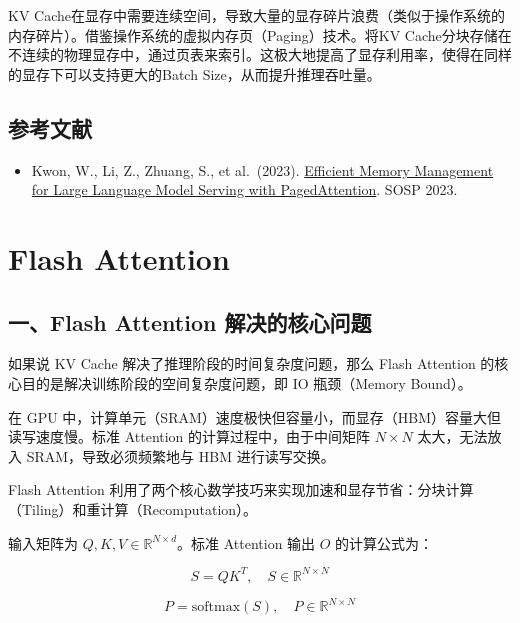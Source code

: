 KV Cache在显存中需要连续空间，导致大量的显存碎片浪费（类似于操作系统的内存碎片）。借鉴操作系统的虚拟内存页（Paging）技术。将KV Cache分块存储在不连续的物理显存中，通过页表来索引。这极大地提高了显存利用率，使得在同样的显存下可以支持更大的Batch Size，从而提升推理吞吐量。

\hypertarget{ux53c2ux8003ux6587ux732e-91}{%
\subsection{参考文献}\label{ux53c2ux8003ux6587ux732e-91}}

\vspace{0.25em}
\begin{itemize}
\tightlist
\item
  Kwon, W., Li, Z., Zhuang, S., et al.~(2023). \href{https://arxiv.org/abs/2309.06180}{Efficient Memory Management for Large Language Model Serving with PagedAttention}. SOSP 2023.
\end{itemize}

\clearpage

\hypertarget{flash-attention}{%
\section{Flash Attention}\label{flash-attention}}

\hypertarget{ux4e00flash-attention-ux89e3ux51b3ux7684ux6838ux5fc3ux95eeux9898}{%
\subsection{一、Flash Attention 解决的核心问题}\label{ux4e00flash-attention-ux89e3ux51b3ux7684ux6838ux5fc3ux95eeux9898}}

如果说 KV Cache 解决了推理阶段的时间复杂度问题，那么 Flash Attention 的核心目的是解决训练阶段的空间复杂度问题，即 IO 瓶颈（Memory Bound）。

在 GPU 中，计算单元（SRAM）速度极快但容量小，而显存（HBM）容量大但读写速度慢。标准 Attention 的计算过程中，由于中间矩阵 \(N \times N\) 太大，无法放入 SRAM，导致必须频繁地与 HBM 进行读写交换。

Flash Attention 利用了两个核心数学技巧来实现加速和显存节省：分块计算（Tiling）和重计算（Recomputation）。

输入矩阵为 \(Q,K,V \in \mathbb{R}^{N \times d}\)。标准 Attention 输出 \(O\) 的计算公式为：

\[
S = QK^T,\quad S \in \mathbb{R}^{N \times N}
\]

\[
P = \mathrm{softmax}(S),\quad P \in \mathbb{R}^{N \times N}
\]

